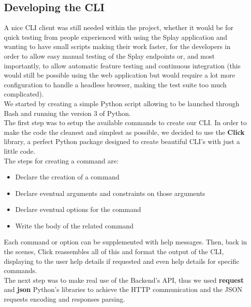 \documentclass{eplmastersthesis}
\begin{document}
      \subsection{Developing the CLI}

        A nice CLI client was still needed within the project, whether it
        would be for quick testing from people experienced with using the
        Splay application and wanting to have small scripts making their
        work faster, for the developers in order to allow easy manual testing
        of the Splay endpoints or, and most importantly, to allow automatic
        feature testing and continuous integration (this would still be
        possible using the web application but would require a lot more
        configuration to handle a headless browser, making the test suite
        too much complicated).\\

        We started by creating a simple Python script allowing to be launched
        through Bash and running the version 3 of Python.\\

        The first step was to setup the available commands to create our CLI.
        In order to make the code the cleanest and simplest as possible, we
        decided to use the \textbf{Click} \cite{click} library, a perfect
        Python package designed to create beautiful CLI's with just a little
        code.\\
        The steps for creating a command are:

        \begin{itemize}
          \item Declare the creation of a command
          \item Declare eventual arguments and constraints on those arguments
          \item Declare eventual options for the command
          \item Write the body of the related command
        \end{itemize}

        Each command or option can be supplemented with help messages. Then,
        back in the scenes, Click reassembles all of this and format the
        output of the CLI, displaying to the user help details if requested
        and even help details for specific commands.\\

        The next step was to make real use of the Backend's API, thus we used
        \textbf{request} \cite{request} and \textbf{json} Python's libraries to
        achieve the HTTP communication and the JSON requests encoding and
        responses parsing.\\
\end{document}
